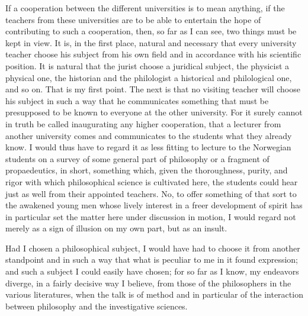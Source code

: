\documentclass[12pt]{book}
\newcommand{\opage}[1]{\marginnote{\footnotesize\textit{[#1]}}}
\begin{document}
If a cooperation between the different universities is to mean anything,
if the teachers from these universities are to be able to entertain the
hope of contributing to such a cooperation, then, so far as I can see, two
things must be kept in view. It is, in the first place, natural and
necessary that every university teacher choose his subject from his own
field and in accordance with his scientific position. It is natural that
the jurist choose a juridical subject, the physicist a physical one, the
historian and the philologist a historical and philological one, and so
on. That is my first point. The next is that no visiting teacher will
choose his subject in such a
\opage{280}\setcounter{footnote}{0}%
way that he communicates something that must be presupposed to be known to
everyone at the other university. For it surely cannot in truth be called
inaugurating any higher cooperation, that a lecturer from another
university comes and communicates to the students what they already know.
I would thus have to regard it as less fitting to lecture to the Norwegian
students on a survey of some general part of philosophy or a fragment of
propaedeutics, in short, something which, given the thoroughness, purity,
and rigor with which philosophical science is cultivated here, the
students could hear just as well from their appointed teachers. No, to
offer something of that sort to the awakened young men whose lively
interest in a freer development of spirit has in particular set the matter
here under discussion in motion, I would regard not merely as a sign of
illusion on my own part, but as an insult.

Had I chosen a philosophical subject, I would have had to choose it from
another standpoint and in such a way that what is peculiar to me in it
found expression; and such a subject I could easily have chosen; for so
far as I know, my endeavors diverge, in a fairly decisive way I believe,
from those of the philosophers in the various literatures, when the talk
is of method and in particular of the interaction between philosophy and
the investigative sciences.
\end{document}
